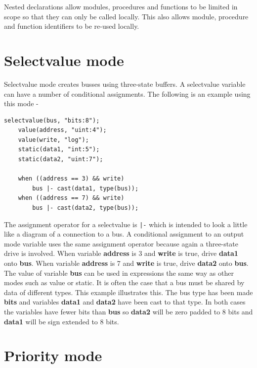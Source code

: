 \documentclass[10pt,a4paper,twoside,fleqn]{article}
\newcommand{\var}[1]{{\bf #1}} %
\begin{document}
    Nested declarations allow modules, procedures and functions to be limited
    in scope so that they can only be called locally. This also allows
    module, procedure and function identifiers to be re-used locally.





\section{Selectvalue mode}

    Selectvalue mode creates busses using three-state buffers. A selectvalue
    variable can have a number of conditional assignments. The following is an
    example using this mode -
    \begin{lstlisting}[language=threepl]
    selectvalue(bus, "bits:8");
    value(address, "uint:4");
    value(write, "log");
    static(data1, "int:5");
    static(data2, "uint:7");
    
    when ((address == 3) && write)
        bus |- cast(data1, type(bus));
    when ((address == 7) && write)
        bus |- cast(data2, type(bus));
    \end{lstlisting}
    The assignment operator for a selectvalue is \verb'|-' which is intended
    to look a little like a diagram of a connection to a bus. A conditional
    assignment to an output mode variable uses the same assignment operator
    because again a three-state drive is involved.
    When variable \var{address} is 3 and \var{write} is true, drive \var{data1}
    onto \var{bus}.
    When variable \var{address} is 7 and \var{write} is true, drive \var{data2}
    onto \var{bus}.
    The value of variable \var{bus} can be used in expressions
    the same way as other modes such as value or static.
    It is often the case that a bus must be shared by data of different types.
    This example illustrates this. The bus type has been made {\bf bits} and
    variables \var{data1} and \var{data2} have been cast to that type. In both
    cases the variables have fewer bits than \var{bus} so \var{data2} will be
    zero padded to 8 bits and \var{data1} will be sign extended to 8 bits.



\section{Priority mode}
\end{document}
